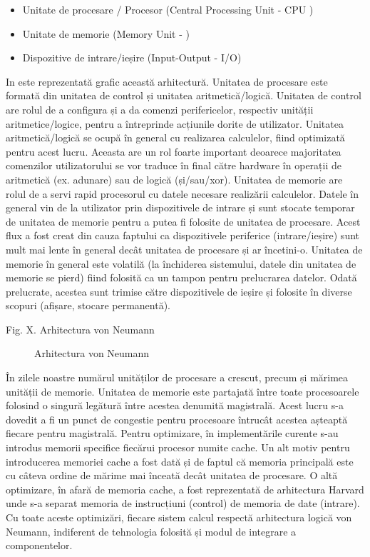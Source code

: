 \begin{itemize}
	\item Unitate de procesare / Procesor (Central Processing Unit - CPU
		)
	\item Unitate de memorie (Memory Unit - )
	\item Dispozitive de intrare/ieșire (Input-Output - I/O)
\end{itemize}

In  este reprezentată grafic această
arhitectură. Unitatea de procesare este formată din unitatea de control și
unitatea aritmetică/logică. Unitatea de control are rolul de a configura și a da
comenzi perifericelor, respectiv unității aritmetice/logice, pentru a
întreprinde acțiunile dorite de utilizator. Unitatea aritmetică/logică se ocupă
în general cu realizarea calculelor, fiind optimizată pentru acest lucru.
Aceasta are un rol foarte important deoarece majoritatea comenzilor
utilizatorului se vor traduce în final către hardware în operații de aritmetică
(ex. adunare) sau de logică (și/sau/xor). Unitatea de memorie are rolul de a
servi rapid procesorul cu datele necesare realizării calculelor. Datele în
general vin de la utilizator prin dispozitivele de intrare și sunt stocate
temporar de unitatea de memorie pentru a putea fi folosite de unitatea de
procesare. Acest flux a fost creat din cauza faptului ca dispozitivele
periferice (intrare/ieșire) sunt mult mai lente în general decât unitatea de
procesare și ar încetini-o. Unitatea de memorie în general este volatilă (la
închiderea sistemului, datele din unitatea de memorie se pierd) fiind folosită
ca un tampon pentru prelucrarea datelor. Odată prelucrate, acestea sunt trimise
către dispozitivele de ieșire și folosite în diverse scopuri (afișare, stocare
permanentă).

Fig. X. Arhitectura von Neumann
\begin{figure}[!htbp]
	\centering
	\def\svgwidth{\columnwidth}
	
	\caption{Arhitectura von Neumann}
	\label{fig:hw-neumann}
\end{figure}

În zilele noastre numărul unităților de procesare a crescut, precum și mărimea
unității de memorie. Unitatea de memorie este partajată între toate
procesoarele folosind o singură legătură între acestea denumită magistrală.
Acest lucru s-a dovedit a fi un punct de congestie pentru procesoare întrucât
acestea așteaptă fiecare pentru magistrală. Pentru optimizare, în implementările
curente s-au introdus memorii specifice fiecărui procesor numite cache. Un alt
motiv pentru introducerea memoriei cache a fost dată și de faptul că memoria
principală este cu câteva ordine de mărime mai înceată decât unitatea de
procesare. O altă optimizare, în afară de memoria cache, a fost reprezentată de
arhitectura Harvard unde s-a separat memoria de instrucțiuni (control) de
memoria de date (intrare). Cu toate aceste optimizări, fiecare sistem calcul
respectă arhitectura logică von Neumann, indiferent de tehnologia folosită și
modul de integrare a componentelor.

